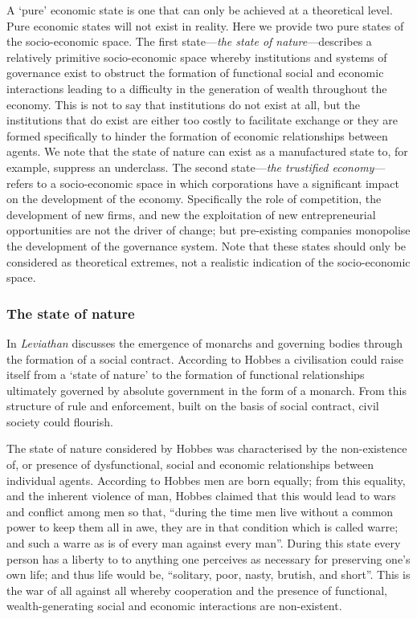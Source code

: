 A `pure' economic state is one that can only be achieved at a theoretical level. Pure economic states will not exist in reality. Here we provide two pure states of the socio-economic space. The first state---\emph{the state of nature}---describes a relatively primitive socio-economic space whereby institutions and systems of governance exist to obstruct the formation of functional social and economic interactions leading to a difficulty in the generation of wealth throughout the economy. This is not to say that institutions do not exist at all, but the institutions that do exist are either too costly to facilitate exchange or they are formed specifically to hinder the formation of economic relationships between agents. We note that the state of nature can exist as a manufactured state to, for example, suppress an underclass. The second state---\emph{the trustified economy}---refers to a socio-economic space in which corporations have a significant impact on the development of the economy. Specifically the role of competition, the development of new firms, and new the exploitation of new entrepreneurial opportunities are not the driver of change; but pre-existing companies monopolise the development of the governance system. Note that these states should only be considered as theoretical extremes, not a realistic indication of the socio-economic space.

\subsubsection{The state of nature}

In \emph{Leviathan} \citet{Hobbes1651} discusses the emergence of monarchs and governing bodies through the formation of a social contract. According to Hobbes a civilisation could raise itself from a `state of nature' to the formation of functional relationships ultimately governed by absolute government in the form of a monarch. From this structure of rule and enforcement, built on the basis of social contract, civil society could flourish.

The state of nature considered by Hobbes was characterised by the non-existence of, or presence of dysfunctional, social and economic relationships between individual agents. According to Hobbes men are born equally; from this equality, and the inherent violence of man, Hobbes claimed that this would lead to wars and conflict among men so that, ``during the time men live without a common power to keep them all in awe, they are in that condition which is called warre; and such a warre as is of every man against every man''. During this state every person has a liberty to to anything one perceives as necessary for preserving one's own life; and thus life would be, ``solitary, poor, nasty, brutish, and short''. This is the war of all against all whereby cooperation and the presence of functional, wealth-generating social and economic interactions are non-existent.

